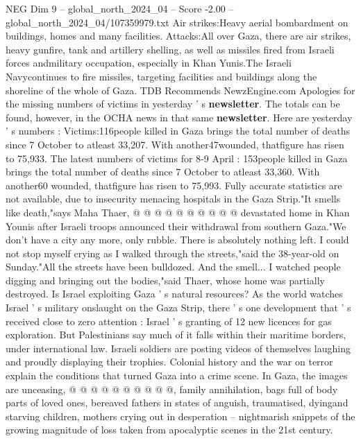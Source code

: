 \begin{textsample}{NEG Dim 9 – global\_north\_2024\_04 – Score -2.00 – global\_north\_2024\_04/107359979.txt}  \label{ex:f9_neg_217}
Air strikes:Heavy aerial bombardment on buildings, homes and many facilities.
Attacks:All over Gaza, there are air strikes, heavy gunfire, tank and artillery shelling, as well as missiles fired from Israeli forces andmilitary occupation, especially in Khan Yunis.The Israeli Navycontinues to fire missiles, targeting facilities and buildings along the shoreline of the whole of Gaza.
TDB Recommends NewzEngine.com Apologies for the missing numbers of victims in yesterday ' s \textbf{newsletter}.
The totals can be found, however, in the OCHA news in that same \textbf{newsletter}.
Here are yesterday ' s numbers : Victims:116people killed in Gaza brings the total number of deaths since 7 October to atleast 33,207.
With another47wounded, thatfigure has risen to 75,933.
The latest numbers of victims for 8-9 April : 153people killed in Gaza brings the total number of deaths since 7 October to atleast 33,360.
With another60 wounded, thatfigure has risen to 75,993.
Fully accurate statistics are not available, due to insecurity menacing hospitals in the Gaza Strip."It smells like death,"says Maha Thaer, @ @ @ @ @ @ @ @ @ @ devastated home in Khan Younis after Israeli troops announced their withdrawal from southern Gaza."We don't have a city any more, only rubble.
There is absolutely nothing left.
I could not stop myself crying as I walked through the streets,"said the 38-year-old on Sunday."All the streets have been bulldozed.
And the smell...
I watched people digging and bringing out the bodies,"said Thaer, whose home was partially destroyed.
Is Israel exploiting Gaza ' s natural resources?
As the world watches Israel ' s military onslaught on the Gaza Strip, there ' s one development that ' s received close to zero attention : Israel ' s granting of 12 new licences for gas exploration.
But Palestinians say much of it falls within their maritime borders, under international law.
Israeli soldiers are posting videos of themselves laughing and proudly displaying their trophies.
Colonial history and the war on terror explain the conditions that turned Gaza into a crime scene.
In Gaza, the images are unceasing, @ @ @ @ @ @ @ @ @ @, family annihilation, bags full of body parts of loved ones, bereaved fathers in states of anguish, traumatised, dyingand starving children, mothers crying out in desperation -- nightmarish snippets of the growing magnitude of loss taken from apocalyptic scenes in the 21st century.

\end{textsample}
